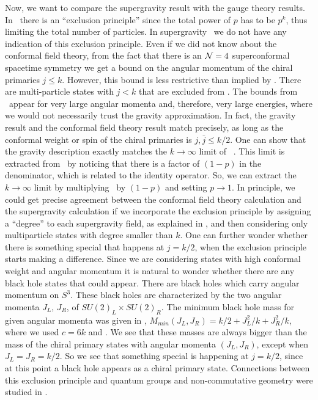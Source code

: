 Now, we want to compare the supergravity result with the gauge theory
results. 
In \chiralp\ there is an ``exclusion principle'' since the total
power of $p$ has to be $p^k$, thus limiting the total number of 
particles. In supergravity \gravitypa\ we do not have any indication 
of this exclusion principle. Even if we did not know 
about the conformal field theory, from the fact that
there is an ${\cal N } = 4$ superconformal spacetime symmetry
we  get  a bound on the angular momentum of the chiral primaries
$j \leq k $.
However, this bound is less
restrictive than implied by  \chiralp . There are 
multi-particle states with $j< k$ that are excluded from 
\chiralp .  The bounds from \chiralp\  appear for very large angular 
momenta and, therefore, very large energies, where we would not
necessarily trust the gravity approximation.
In fact, the gravity result and the conformal field theory result
match precisely, as long as the conformal weight or spin of 
the chiral primaries  
is $j,{\bar j} \leq k/2 $. 
One can show that the gravity description exactly matches the 
$k \to \infty$ limit of \chiralp\ \cite{deBoer:1998ip}. 
 This limit is extracted from \chiralp\  by noticing that
there is a factor of $(1-p)$ in the denominator, which  is related to the
identity operator. So, we can extract the $k  \to \infty$ limit 
by multiplying \chiralp\ by $(1-p)$ and setting $p\to 1$. 
In principle, we could get precise agreement between the conformal field
theory calculation and the supergravity calculation if we incorporate the
exclusion principle by assigning a ``degree'' to each supergravity
field, as explained in \cite{deBoer:1998us}, and then considering only 
multiparticle states with degree smaller than $k$. 
One can further wonder whether there is something special that
happens at $j=k/2$, when the exclusion principle starts making a
 difference.  Since we are considering states with 
high conformal weight and angular momentum it is natural to wonder 
whether there are any black hole states that could appear. 
There are black holes which carry angular momentum on $S^3$. 
These black holes are characterized by the two angular momenta
$J_L$, $J_R$, of $SU(2)_L\times SU(2)_R$. 
The minimum black hole mass for given angular momenta was given 
in \masslb,
$M_{min}(J_L,J_R) = k/2 + J^2_L/k + J^2_R/k$,
where we used $c  =6k$ and \brown .
We see that these masses are always bigger than the mass 
of the chiral primary states with angular momenta
$(J_L,J_R)$, except when $J_L = J_R = k/2 $. So we see that 
something special is happening at $j=k/2$, since at this
point a black hole appears as a  chiral primary state. 
Connections between this exclusion principle and quantum groups
and non-commutative geometry were studied in 
\cite{Jevicki:1999rr,Chang:1999jm}.

